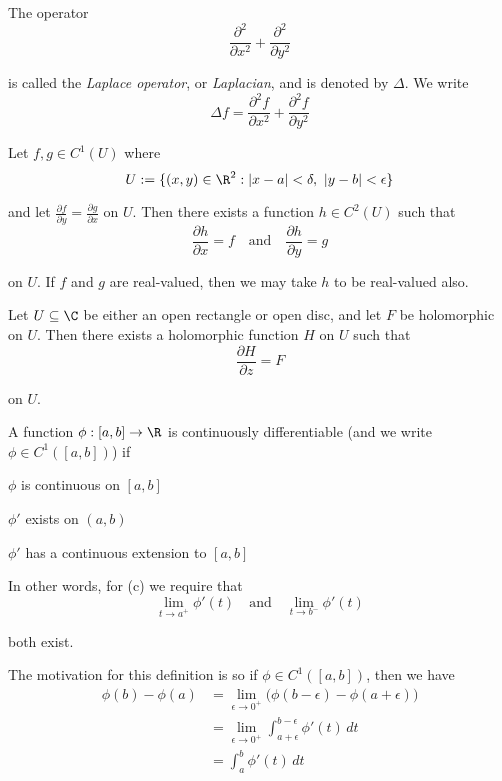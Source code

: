 The operator
$$
  \frac{\partial^2}{\partial x^2}+\frac{\partial^2}{\partial y^2}
$$

is called the \textit{Laplace operator}, or \textit{Laplacian}, and is denoted
by $\Delta$. We write
$$
  \Delta f=\frac{\partial^2f}{\partial x^2}+\frac{\partial^2f}{\partial y^2}
$$

\Theorem{}\label{fdd4521}

Let $f,g\in C^1(U)$ where
$$
  U:=\{ (x,y)\in\R^2:|x-a|<\delta,\ |y-b|<\epsilon \}
$$

and let $\displaystyle\frac{\partial f}{\partial y}=\frac{\partial g}{\partial
x}$ on $U$. Then there exists a function $h\in C^2(U)$ such that
$$
  \frac{\partial h}{\partial x}=f
  \quad\text{and}\quad
  \frac{\partial h}{\partial y}=g
$$

on $U$. If $f$ and $g$ are real-valued, then we may take $h$ to be real-valued
also.

\Theorem{}\label{e7808d1}

Let $U\subseteq\C$ be either an open rectangle or open disc, and let $F$ be
holomorphic on $U$. Then there exists a holomorphic function $H$ on $U$ such
that
$$
  \frac{\partial H}{\partial z}=F
$$

on $U$.

\label{c1f6d35}

A function $\phi:[a,b]\to\R$ is continuously differentiable (and we write
$\phi\in C^1([a,b])$) if

\begin{enumerata}
  \item $\phi$ is continuous on $[a,b]$
  \item $\phi'$ exists on $(a,b)$
  \item $\phi'$ has a continuous extension to $[a,b]$
\end{enumerata}

In other words, for (c) we require that
$$
  \lim_{t\to a^+}\phi'(t)\quad\text{and}\quad\lim_{t\to b^-}\phi'(t)
$$

both exist.

The motivation for this definition is so if $\phi\in C^1([a,b])$, then we have
\begin{align*}
  \phi(b)-\phi(a)
   &=\lim_{\epsilon\to0^+}\bigl(\phi(b-\epsilon)-\phi(a+\epsilon)\bigr) \\
   &=\lim_{\epsilon\to0^+}\int_{a+\epsilon}^{b-\epsilon}\phi'(t)\,dt    \\
   &=\int_a^b\phi'(t)\,dt
\end{align*}

